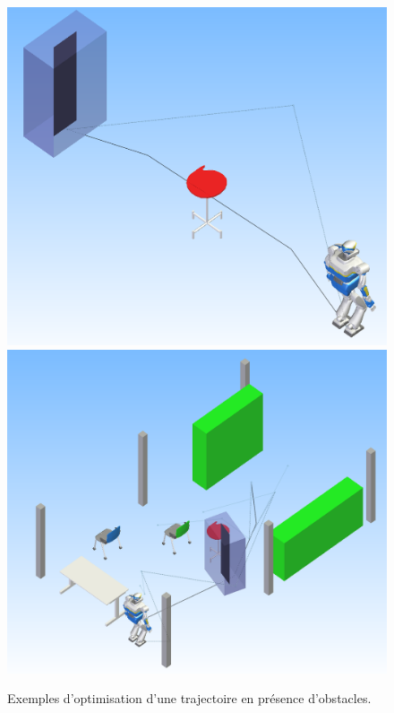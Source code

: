 \begin{figure}[htbp]
  \begin{center}
\includegraphics[width=.8\linewidth]{src/chap1-roboptim/straight-line-obstacle.png}
\includegraphics[width=.8\linewidth]{src/chap1-roboptim/optim-length.png}
  \end{center} \caption{Exemples d'optimisation d'une trajectoire en
  présence d'obstacles. \label{fig:obstacle}}
\end{figure}

